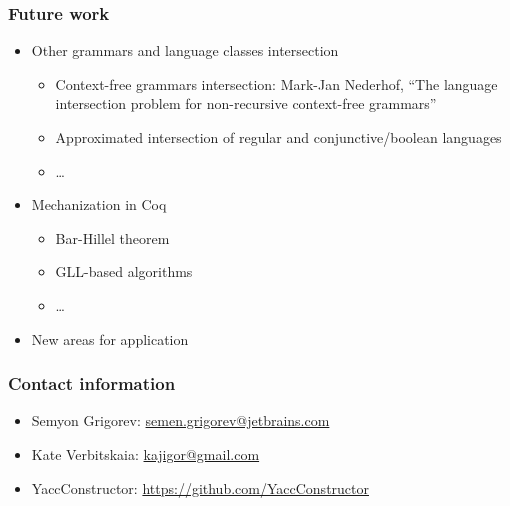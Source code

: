 \documentclass{beamer}
\begin{document}
\begin{frame}[fragile]
\transwipe[direction=90]
\frametitle{Future work}
\begin{itemize}
  \item Other grammars and language classes intersection
  \begin{itemize}
     \item Context-free grammars intersection: Mark-Jan Nederhof, ``The language intersection problem for non-recursive context-free grammars''
     \item Approximated intersection of regular and conjunctive/boolean languages
     \item \dots
  \end{itemize}
  \item Mechanization in Coq
  \begin{itemize}
     \item Bar-Hillel theorem
     \item GLL-based algorithms
     \item \dots
  \end{itemize}
  \item New areas for application
\end{itemize}
\end{frame}
            
\begin{frame}
\transwipe[direction=90]
\frametitle{Contact information}
\begin{itemize}
  \item Semyon Grigorev: \href{mailto:semen.grigorev@jetbrains.com}{semen.grigorev@jetbrains.com}
  \item Kate Verbitskaia: \href{mailto:kajigor@gmail.com}{kajigor@gmail.com}
\end{itemize}
\begin{itemize}
  \item YaccConstructor: \href{https://github.com/YaccConstructor}{https://github.com/YaccConstructor}
\end{itemize}
\end{frame}
\end{document}
